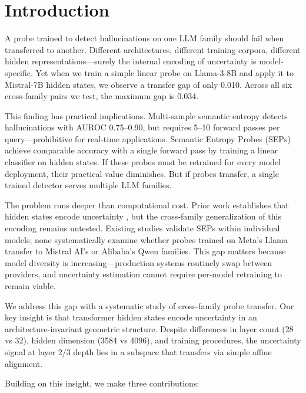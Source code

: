 \section{Introduction}

A probe trained to detect hallucinations on one LLM family should fail when transferred to another. Different architectures, different training corpora, different hidden representations---surely the internal encoding of uncertainty is model-specific. Yet when we train a simple linear probe on Llama-3-8B and apply it to Mistral-7B hidden states, we observe a transfer gap of only 0.010. Across all six cross-family pairs we test, the maximum gap is 0.034.

This finding has practical implications. Multi-sample semantic entropy \citep{farquhar2024detecting} detects hallucinations with AUROC 0.75--0.90, but requires 5--10 forward passes per query---prohibitive for real-time applications. Semantic Entropy Probes (SEPs) \citep{kossen2024semantic} achieve comparable accuracy with a single forward pass by training a linear classifier on hidden states. If these probes must be retrained for every model deployment, their practical value diminishes. But if probes transfer, a single trained detector serves multiple LLM families.

The problem runs deeper than computational cost. Prior work establishes that hidden states encode uncertainty \citep{kossen2024semantic}, but the cross-family generalization of this encoding remains untested. Existing studies validate SEPs within individual models; none systematically examine whether probes trained on Meta's Llama transfer to Mistral AI's or Alibaba's Qwen families. This gap matters because model diversity is increasing---production systems routinely swap between providers, and uncertainty estimation cannot require per-model retraining to remain viable.

We address this gap with a systematic study of cross-family probe transfer. Our key insight is that transformer hidden states encode uncertainty in an architecture-invariant geometric structure. Despite differences in layer count (28 vs 32), hidden dimension (3584 vs 4096), and training procedures, the uncertainty signal at layer 2/3 depth lies in a subspace that transfers via simple affine alignment.

Building on this insight, we make three contributions:

